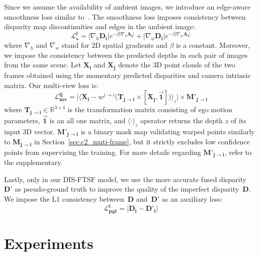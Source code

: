 Since we assume the availability of ambient images, we introduce an edge-aware smoothness loss similar to~\cite{godard2017unsupervised,godard2019digging}. The smoothness loss imposes consistency between disparity map discontinuities and edges in the ambient image:
\begin{equation}
    \boldsymbol{\mathcal{L}^{i}_{s}}= |\nabla_{h} \boldsymbol{D_{i}}|e^{-\beta|\nabla_{h} \boldsymbol{A_{i}}|}
    +
    |\nabla_{w} \boldsymbol{D_{i}}|e^{-\beta|\nabla_{w} \boldsymbol{A_{i}}|}
\end{equation}
where $\nabla_{h}$ and $\nabla_{w}$ stand for 2D spatial gradients and $\beta$ is a constant. Moreover, we impose the consistency between the predicted depths in each pair of images from the same scene. Let $\boldsymbol{X_{i}}$ and $\boldsymbol{X_{j}}$ denote the 3D point clouds of the two frames obtained using the momentary predicted disparities and camera intrinsic matrix. Our multi-view loss is:
\begin{equation}
    \boldsymbol{\mathcal{L}^{ij}_{mv}}=
    \bigg|
    \Big \langle \boldsymbol{X_{i}} -
    w^{j \rightarrow i}
    \big( \boldsymbol{T_{j \rightarrow i}} \times [\boldsymbol{X_{j}},\vec{\mathbf{1}}] \big) \Big \rangle_z
    \bigg| \times \boldsymbol{M'_{j \rightarrow i}}
\end{equation}
where $\boldsymbol{T_{j \rightarrow i}} \in \mathbb{R}^{3 \times 4}$ is the transformation matrix consisting of ego motion parameters, $\vec{\mathbf{1}}$ is an all one matrix, and $\langle\cdot\rangle_z$ operator returns the depth $z$ of its input 3D vector. $\boldsymbol{M'_{j \rightarrow i}}$ is a binary mask map validating warped points similarly to $\boldsymbol{M_{j \rightarrow i}}$ in Section~\ref{sec:c2_muti-frame}, but it strictly excludes low confidence points from supervising the training. For more details regarding $\boldsymbol{M'_{j \rightarrow i}}$, refer to the supplementary.

Lastly, only in our DIS-FTSF model, we use the more accurate fused disparity~$\boldsymbol{D'}$ as pseudo-ground truth to improve the quality of the imperfect disparity~$\boldsymbol{D}$. We impose the L1 consistency between~$\boldsymbol{D}$ and~$\boldsymbol{D'}$ as an auxiliary loss:
\begin{equation}
    \boldsymbol{\mathcal{L}^{i}_{pgt}}=
    |\boldsymbol{D_{i}} - \boldsymbol{D'_{i}}|
\end{equation}

\section{Experiments}
\label{sec:c2_experiments}

